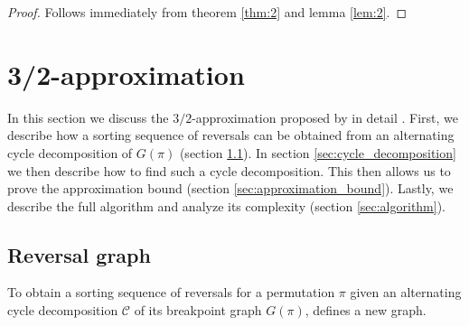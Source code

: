 \documentclass[11pt,DIV=11]{scrartcl}
\theoremstyle{definition}
\theoremstyle{remark}
\begin{document}
\begin{proof}
Follows immediately from theorem \ref{thm:2} and lemma \ref{lem:2}.
\end{proof}

\section{3/2-approximation}
\label{sec:32_approximation}

In this section we discuss the $3/2$-approximation proposed by \citeauthor*{Christie1998} in detail \cite{Christie1998}. First, we describe how a sorting sequence of reversals can be obtained from an alternating cycle decomposition of $G(\pi)$ (section \ref{sec:reversal_graph}). In section \ref{sec:cycle_decomposition} we then describe how to find such a cycle decomposition. This then allows us to prove the approximation bound (section \ref{sec:approximation_bound}). Lastly, we describe the full algorithm and analyze its complexity (section \ref{sec:algorithm}).

\subsection{Reversal graph}
\label{sec:reversal_graph}

To obtain a sorting sequence of reversals for a permutation $\pi$ given an alternating cycle decomposition $\mathcal{C}$ of its breakpoint graph $G(\pi)$, \citeauthor*{Christie1998} defines a new graph.
\end{document}

